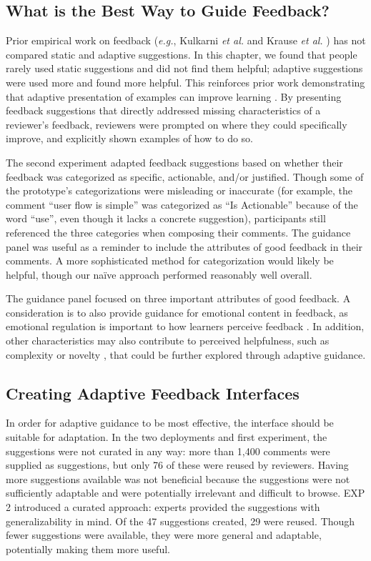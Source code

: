 \subsection{What is the Best Way to Guide Feedback?}
Prior empirical work on feedback (\textit{e.g.}, Kulkarni \textit{et al.} \cite{Kulkarni2013} and Krause \textit{et al.} \cite{Krause2017}) has not compared static and adaptive suggestions. In this chapter, we found that people rarely used static suggestions and did not find them helpful; adaptive suggestions were used more and found more helpful. This reinforces prior work demonstrating that adaptive presentation of examples can improve learning \cite{Lee2010, Najar2014}. By presenting feedback suggestions that directly addressed missing characteristics of a reviewer's feedback, reviewers were prompted on where they could specifically improve, and explicitly shown examples of how to do so. 

The second experiment adapted feedback suggestions based on whether their feedback was categorized as specific, actionable, and/or justified. Though some of the prototype's categorizations were misleading or inaccurate (for example, the comment ``user flow is simple'' was categorized as ``Is Actionable'' because of the word ``use'', even though it lacks a concrete suggestion), participants still referenced the three categories when composing their comments. The guidance panel was useful as a reminder to include the attributes of good feedback in their comments. A more sophisticated method for categorization would likely be helpful, though our naïve approach performed reasonably well overall.

The guidance panel focused on three important attributes of good feedback. A consideration is to also provide guidance for emotional content in feedback, as emotional regulation is important to how learners perceive feedback \cite{Krause2017, Varlander2008}. In addition, other characteristics may also contribute to perceived helpfulness, such as complexity or novelty \cite{Krause2017}, that could be further explored through adaptive guidance.

\subsection{Creating Adaptive Feedback Interfaces}
In order for adaptive guidance to be most effective, the interface should be suitable for adaptation. In the two deployments and first experiment, the suggestions were not curated in any way: more than 1,400 comments were supplied as suggestions, but only 76 of these were reused by reviewers. Having more suggestions available was not beneficial because the suggestions were not sufficiently adaptable and were potentially irrelevant and difficult to browse. EXP 2 introduced a curated approach: experts provided the suggestions with generalizability in mind. Of the 47 suggestions created, 29 were reused. Though fewer suggestions were available, they were more general and adaptable, potentially making them more useful. 


